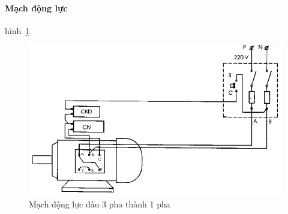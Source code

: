 \documentclass[13pt,a4paper]{extarticle}
\begin{document}
\paragraph{Mạch động lực} hình~\ref{Fig:3p-1p-dong-luc}.
\begin{figure}[!h]
\begin{center}
\includegraphics[scale=.5]{3p-1p-dong-luc}
\end{center}
\caption{Mạch động lực đấu 3 pha thành 1 pha}
\label{Fig:3p-1p-dong-luc}
\end{figure}
\end{document}
